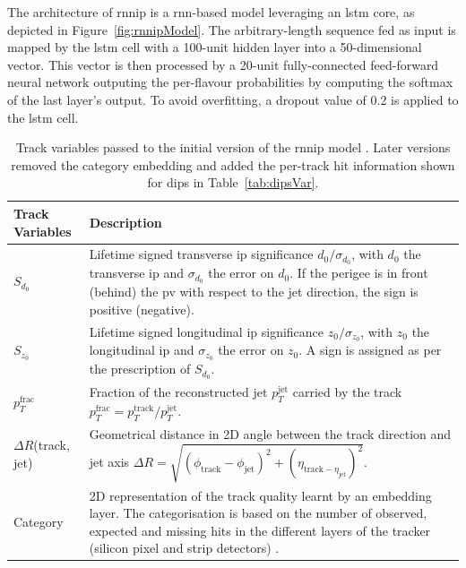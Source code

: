 The architecture of \gls{rnnip} is a \gls{rnn}-based model leveraging an \gls{lstm} core, as depicted in Figure~\ref{fig:rnnipModel}. The arbitrary-length sequence fed as input is mapped by the \gls{lstm} cell with a 100-unit hidden layer into a 50-dimensional vector. This vector is then processed by a 20-unit fully-connected feed-forward neural network outputing the per-flavour probabilities by computing the softmax of the last layer's output. To avoid overfitting, a dropout value of 0.2 is applied to the \gls{lstm} cell. 

\begin{table}[h]
  \begin{center}
      \begin{tabular}{C{3cm}|C{13cm}} 
      	 \hline \hline
          Track Variables & Description  \\ \hline \hline
          $S_{d_0}$      & Lifetime signed transverse \gls{ip} significance $d_0 / \sigma_{d_0}$, with $d_0$ the transverse \gls{ip} and $\sigma_{d_0}$ the error on $d_0$. If the perigee is in front (behind) the \gls{pv} with respect to the jet direction, the sign is positive (negative). \\ \hline
          $S_{z_0}$      & Lifetime signed longitudinal \gls{ip} significance $z_0 / \sigma_{z_0}$, with $z_0$ the longitudinal \gls{ip} and $\sigma_{z_0}$ the error on $z_0$. A sign is assigned as per the prescription of $S_{d_0}$. \\ \hline
          $p_T^{\textrm{frac}}$   & Fraction of the reconstructed jet $p_T^{\textrm{jet}}$ carried by the track $p_T^{\textrm{frac}} = p_T^{\textrm{track}} / p_T^{\textrm{jet}}$. \\ \hline
          $\Delta R$(track, jet) & Geometrical distance in 2D angle between the track direction and jet axis $\Delta R = \sqrt{(\phi_{\textrm{track}} - \phi_{\textrm{jet}})^2 + (\eta_{\textrm{track} - \eta_{\textrm{jet}}})^2}$. \\ \hline
          Category       & 2D representation of the track quality learnt by an embedding layer. The categorisation is based on the number of observed, expected and missing hits in the different layers of the tracker (silicon pixel and strip detectors) \cite{ATL-PHYS-PUB-2015-022}.  \\ \hline
      \end{tabular}
    \caption{Track variables passed to the initial version of the \gls{rnnip} model \cite{ATL-PHYS-PUB-2017-003}. Later versions removed the category embedding and added the per-track hit information shown for \gls{dips} in Table~\ref{tab:dipsVar}.}
    \label{tab:rnnipVar}
  \end{center}
\end{table}

